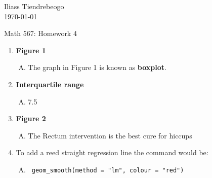\documentclass{article}[12pt]
\begin{document}
\hfill Iliass Tiendrebeogo\\

\hfill \today\\

\bigskip

\begin{center}
  \begin{Large}
    Math 567: Homework 4 \\
    
   
  \end{Large}
\end{center} 


\begin{enumerate}[1.]
\item  %
{\bf Figure 1 }
 \begin{enumerate}[C.]
 \item 
The graph in Figure 1 is known as {\bf boxplot}.
\end{enumerate}
\item %
{\bf Interquartile range}
 \begin{enumerate}[A.]
 \item 
  7.5
  \end{enumerate}

\item %
{\bf Figure 2}
 \begin{enumerate}[C.]
 \item 
  The Rectum intervention is the best cure for hiccups
  \end{enumerate}

\item %
To add a reed straight regression line the command would be:
 \begin{enumerate}[C.]
 \item 
  \texttt{ geom\_smooth(method = "lm", colour = "red") }
  
  
 \end{enumerate}

\end{enumerate}
\end{document}
